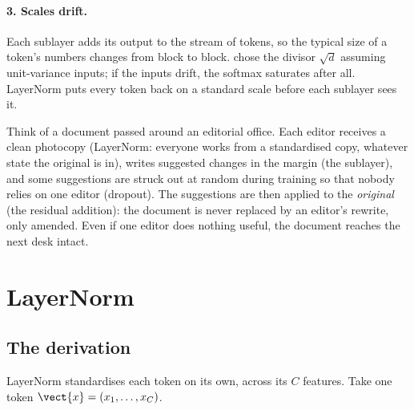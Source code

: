 \paragraph{3. Scales drift.} Each sublayer adds its output to the stream of tokens, so the typical
size of a token's numbers changes from block to block.  chose the divisor
$\sqrt d$ assuming unit-variance inputs; if the inputs drift, the softmax saturates after all.
LayerNorm puts every token back on a standard scale before each sublayer sees it.

\begin{analogy}
Think of a document passed around an editorial office. Each editor receives a clean photocopy
(LayerNorm: everyone works from a standardised copy, whatever state the original is in), writes
suggested changes in the margin (the sublayer), and some suggestions are struck out at random
during training so that nobody relies on one editor (dropout). The suggestions are then applied to
the \emph{original} (the residual addition): the document is never replaced by an editor's
rewrite, only amended. Even if one editor does nothing useful, the document reaches the next desk
intact.
\end{analogy}

\section{LayerNorm}\label{sec:block:ln}

\subsection{The derivation}

LayerNorm \citep{ba2016layer} standardises each token on its own, across its $C$
features. Take one token $\vect{x} = (x_1, \dots, x_C)$.

